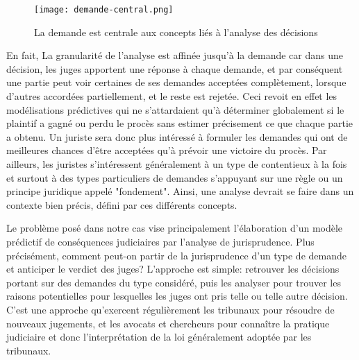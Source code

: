\begin{figure}[h]
    \centering
    \texttt{[image: demande-central.png]}
    \caption{La demande est centrale aux concepts liés à l'analyse des décisions}
    \label{fig:intro:demande-central}
\end{figure}

En fait, La granularité de l'analyse est affinée jusqu'à la demande car dans une décision, les juges apportent une réponse à chaque demande, et par conséquent une partie peut voir certaines de ses demandes acceptées complètement, lorsque d'autres accordées partiellement, et le reste est rejetée.  Ceci revoit en effet les modélisations prédictives qui ne s'attardaient qu'à déterminer globalement si le plaintif a  gagné ou perdu le procès sans estimer précisement ce que chaque partie a obtenu. Un juriste sera donc plus intéressé à formuler les demandes qui ont de meilleures chances d'être acceptées qu'à prévoir une victoire du procès. Par ailleurs, les juristes s'intéressent généralement à un type de contentieux à la fois et surtout à des types particuliers de demandes s'appuyant sur une règle ou un principe juridique appelé "fondement". Ainsi, une analyse devrait se faire dans un contexte bien précis, défini par ces différents concepts.


Le problème posé dans notre cas vise principalement l'élaboration d'un modèle prédictif de conséquences judiciaires par l'analyse de jurisprudence. Plus précisément, comment peut-on partir de la jurisprudence d'un type de demande et anticiper le verdict des juges? L'approche est simple: retrouver les décisions portant sur des demandes du type considéré, puis les analyser pour trouver les raisons potentielles pour lesquelles les juges ont pris telle ou telle autre décision. C'est une approche qu'exercent régulièrement les tribunaux pour résoudre de nouveaux jugements, et les avocats et chercheurs pour connaître la pratique judiciaire et donc l'interprétation de la loi généralement adoptée par les tribunaux.


